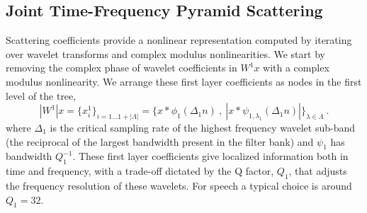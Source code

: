 \subsection{Joint Time-Frequency Pyramid Scattering}

Scattering coefficients provide a nonlinear representation 
computed by iterating over wavelet transforms and complex modulus nonlinearities. 
%
We start by removing the complex phase of wavelet coefficients in $W^1x$ with a 
complex modulus nonlinearity. We arrange these first layer coefficients as nodes in the first level of the tree,
\[
|W^1| x = \{ x^1_i \}_{i=1\dots 1+|\Lambda|}= \{x \ast \phi_1(\Delta_1 n)~,~|x \ast \psi_{1,\lambda_1}(\Delta_1 n)|  \}_{\lambda \in \Lambda}~.
\]
where $\Delta_1$ is the critical sampling rate of the highest frequency wavelet sub-band 
(the reciprocal of the largest bandwidth present
in the filter bank) and $\psi_1$ has bandwidth $Q_1^{-1}$.
These first layer coefficients give localized information both in
time and frequency, with a trade-off dictated by the Q factor, $Q_1$, that adjusts the frequency resolution of 
these wavelets.  For speech a typical choice is around $Q_1=32$.

